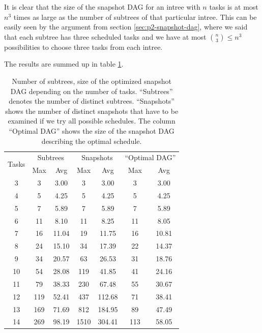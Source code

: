 
It is clear that the size of the snapshot DAG for an intree with $n$ tasks is at most $n^3$ times as large as the number of subtrees of that particular intree. This can be easily seen by the argument from section \ref{sec:p2-snapshot-dag}, where we said that each subtree has three scheduled tasks and we have at most $\binom{n}{3} \leq n^3$ possibilities to choose three tasks from each intree.


The results are summed up in table \ref{tab:num-subtrees-size-of-dags}.

\begin{table}[ht]
  \centering
  \begin{tabular}[ht]{ccccccc}
    \multirow{2}{*}{Tasks} & \multicolumn{2}{c}{Subtrees} & \multicolumn{2}{c}{Snapshots} & \multicolumn{2}{c}{``Optimal DAG''} \\
    & Max & Avg & Max & Avg & Max & Avg \\
    \hline
    3 & 3 & 3.00 & 3 & 3.00 & 3 & 3.00  \\
    4 & 5 & 4.25 & 5 & 4.25 & 5 & 4.25  \\
    5 & 7 & 5.89 & 7 & 5.89 & 7 & 5.89  \\
    6 & 11 & 8.10 & 11 & 8.25 & 11 & 8.05  \\
    7 & 16 & 11.04 & 19 & 11.75 & 16 & 10.81  \\
    8 & 24 &  15.10 & 34 & 17.39 & 22 & 14.37  \\
    9 & 34 &  20.57 & 63 & 26.53 & 31 & 18.76  \\
    10 & 54 &  28.08 & 119 & 41.85 & 41 & 24.16  \\
    11 & 79 &  38.33 & 230 & 67.48 & 55 & 30.67  \\
    12 & 119 & 52.41 & 437 & 112.68 & 71 & 38.41  \\
    13 & 169 &  71.69 & 812 & 184.95 & 89 & 47.49  \\
    14 & 269 &  98.19 & 1510 & 304.41 & 113 & 58.05  \\
  \end{tabular}
  \caption{Number of subtrees, size of the optimized snapshot DAG depending on the number of tasks. ``Subtrees'' denotes the number of distinct subtrees. ``Snapshots'' shows the number of distinct snapshots that have to be examined if we try all possible schedules. The column ``Optimal DAG'' shows the size of the snapshot DAG describing the optimal schedule.}
  \label{tab:num-subtrees-size-of-dags}
\end{table}

